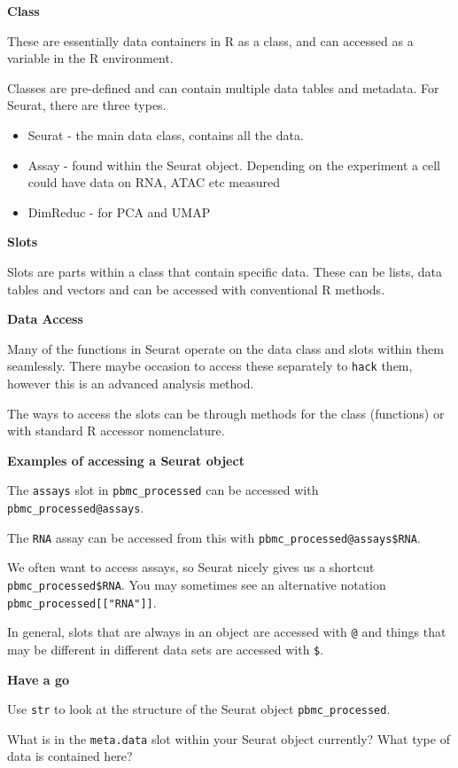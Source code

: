 \documentclass[
]{book}
\providecommand{\tightlist}{%
  \setlength{\itemsep}{0pt}\setlength{\parskip}{0pt}}
\begin{document}
\textbf{Class}

These are essentially data containers in R as a class, and can accessed as a variable in the R environment.

Classes are pre-defined and can contain multiple data tables and metadata. For Seurat, there are three types.

\begin{itemize}
\tightlist
\item
  Seurat - the main data class, contains all the data.
\item
  Assay - found within the Seurat object. Depending on the experiment a cell could have data on RNA, ATAC etc measured
\item
  DimReduc - for PCA and UMAP
\end{itemize}

\textbf{Slots}

Slots are parts within a class that contain specific data. These can be lists, data tables and vectors and can be accessed with conventional R methods.

\textbf{Data Access}

Many of the functions in Seurat operate on the data class and slots within them seamlessly. There maybe occasion to access these separately to \texttt{hack} them, however this is an advanced analysis method.

The ways to access the slots can be through methods for the class (functions) or with standard R accessor nomenclature.

\textbf{Examples of accessing a Seurat object}

The \texttt{assays} slot in \texttt{pbmc\_processed} can be accessed with \texttt{pbmc\_processed@assays}.

The \texttt{RNA} assay can be accessed from this with \texttt{pbmc\_processed@assays\$RNA}.

We often want to access assays, so Seurat nicely gives us a shortcut \texttt{pbmc\_processed\$RNA}. You may sometimes see an alternative notation \texttt{pbmc\_processed{[}{[}"RNA"{]}{]}}.

In general, slots that are always in an object are accessed with \texttt{@} and things that may be different in different data sets are accessed with \texttt{\$}.

\textbf{Have a go}

Use \texttt{str} to look at the structure of the Seurat object \texttt{pbmc\_processed}.

What is in the \texttt{meta.data} slot within your Seurat object currently? What type of data is contained here?
\end{document}
